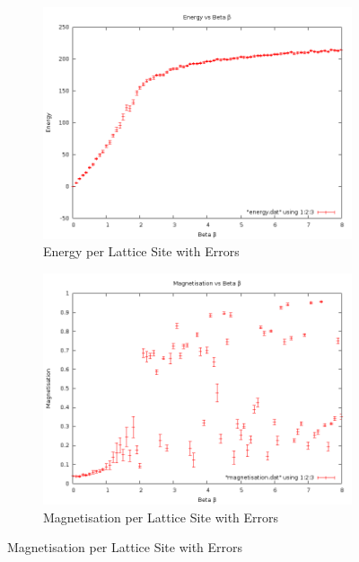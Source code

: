 \documentclass[12pt,a4paper,notitlepage,twoside]{article}
\begin{document}
\begin{figure}[H]
\centering
	\begin{subfigure}[b]{0.45\textwidth}
		\includegraphics[width=\textwidth]{q10d20/energy.png}	
		\caption{Energy per Lattice Site with Errors}
	\end{subfigure}
	\begin{subfigure}[b]{0.45\textwidth}
		\includegraphics[width=\textwidth]{q10d20/magnetisation.png}
		\caption{Magnetisation per Lattice Site with Errors}
	\end{subfigure}
\end{figure}
\end{document}
